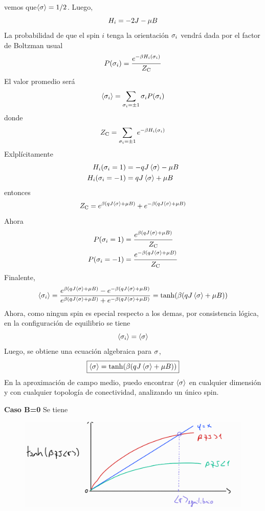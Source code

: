 \begin{ej}
vemos que$\ev{\s}=1/2$. Luego,
\begin{equation}
  H_i=-2J-\mu B
\end{equation}
La probabilidad de que el spin $i$ tenga la orientación $\sigma_i$ vendrá dada por el factor de Boltzman usual
\begin{equation}
  P(\sigma_i)=\frac{e^{-\beta H_i(\sigma_i )}}{Z_{\rm C} }
\end{equation}
El valor promedio será
\begin{equation}
  \ev{\s_i}=\sum_{\s_i=\pm 1}\s_iP(\s_i)
\end{equation}
donde 
\begin{equation}
  Z_{\rm C}=\sum_{\sigma_i=\pm 1} e^{-\beta H_i(\sigma_i)}
\end{equation}
Exlplícitamente
\begin{align}
  H_i(\s_i=1)&=-qJ\ev{\s}-\m B\\
  H_i(\s_i=-1)&=qJ\ev{\s}+\m B
\end{align}
entonces 
\begin{equation}
  \zc=e^{\b(qJ\ev{\s}+\m B)}+e^{-\b(qJ\ev{\s}+\m B)}
\end{equation}
Ahora
\begin{align}
  P(\s_i=1)&=\frac{e^{\b(qJ\ev{\s}+\m B)}}{\zc }\\
   P(\s_i=-1)&=\frac{e^{-\b(qJ\ev{\s}+\m B)}}{\zc }
\end{align}
Finalente,
\begin{equation}
  \ev{\s_i}=\frac{e^{\b(qJ\ev{\s}+\m B)}-e^{-\b(qJ\ev{\s}+\m B)}}{e^{\b(qJ\ev{\s}+\m B)}+e^{-\b(qJ\ev{\s}+\m B)}}=\tanh (\b(qJ\ev{\s}+\m B))
\end{equation}
Ahora, como ningun spin es epecial respecto a los demas, por consistencia lógica, en la configuración de equilibrio se tiene
\begin{equation}
  \ev{\s_i}=\ev{\s}
\end{equation}
Luego, se obtiene una ecuación algebraica para $\sigma$,
\begin{equation}
 \boxed{ \ev{\s}=\tanh (\b(qJ\ev{\s}+\m B))}
\end{equation}
En la aproximación de campo medio, puedo encontrar $\ev{\s}$ en cualquier dimensión y con cualquier topología de conectividad, analizando un único spin.
\end{ej}

\textbf{Caso B=0}
Se tiene
\begin{figure}[h!]
	\centering
	\includegraphics[scale=0.4]{fig/31-gra}
\end{figure}

